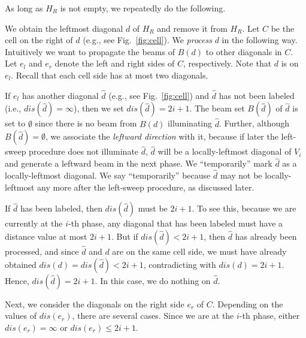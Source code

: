 \documentclass[english,runningheads,11pt]{llncs-revised}
\def\hatd{\hat{d}}
\begin{document}
As long as $H_R$ is not empty, we repeatedly do the following.

We obtain the leftmost diagonal $d$ of $H_R$ and remove it from $H_R$.
Let $C$ be the cell on the right of $d$ (e.g., see Fig.~\ref{fig:cell}).
We {\em process} $d$ in the following way. Intuitively we want to
propagate the beams of $B(d)$ to other diagonals in $C$.
Let $e_l$ and $e_r$ denote the left and right sides of $C$, respectively.
Note that $d$ is on $e_l$.  Recall that each cell side has at
most two diagonals.

If $e_l$ has another diagonal $\hatd$ (e.g., see Fig.~\ref{fig:cell}) and $\hatd$ has
not been labeled (i.e., $dis(\hatd)=\infty$), then we set $dis(\hatd)=2i+1$. The beam set
$B(\hatd)$ of $\hatd$ is set to $\emptyset$
since there is no beam from $B(d)$ illuminating $\hatd$.
Further, although $B(\hatd)=\emptyset$, we associate the {\em
leftward direction} with it, because
if later the left-sweep procedure does not illuminate $\hatd$, $\hatd$
will be a locally-leftmost diagonal of $V_i$ and
generate a leftward beam in the next phase.
We ``temporarily'' mark $\hatd$ as a locally-leftmost
diagonal.
We say ``temporarily'' because $\hatd$ may not be
locally-leftmost any more after the left-sweep procedure, as discussed later.

If $\hatd$ has been labeled, then $dis(\hatd)$ must be $2i+1$. To see this, because we are currently at the $i$-th phase, any diagonal that has been labeled must have a distance value at most $2i+1$. But if $dis(\hatd)<2i+1$, then $\hatd$ has already been processed, and since $\hatd$ and $d$ are on the same cell side, we must have already obtained $dis(d)=dis(\hatd)<2i+1$, contradicting with $dis(d)=2i+1$. Hence, $dis(\hatd)=2i+1$. In this case, we do nothing on $\hatd$.


Next, we consider the diagonals on
the right side $e_r$ of $C$. Depending on the values
of $dis(e_r)$, there are several cases. Since we are at the $i$-th
phase, either $dis(e_r)=\infty$ or $dis(e_r)\leq 2i+1$.
\end{document}
